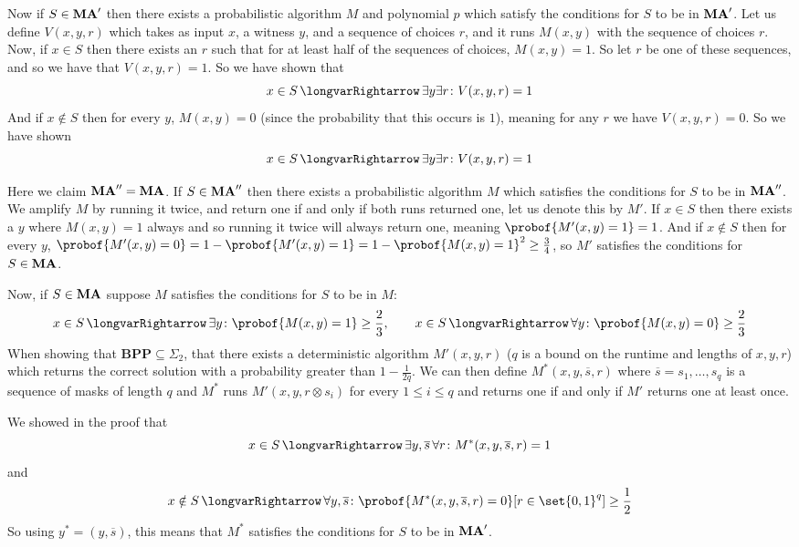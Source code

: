 \documentclass[10pt]{article}
\def\implies{\,\longvarRightarrow\,}
\def\BPP{\mathbf{BPP}}
\begin{document}
    Now if $S\in\mathbf{MA}'$ then there exists a probabilistic algorithm $M$ and polynomial $p$ which satisfy the conditions for $S$ to be in $\mathbf{MA}'$.
    Let us define $V(x,y,r)$ which takes as input $x$, a witness $y$, and a sequence of choices $r$, and it runs $M(x,y)$ with the sequence of choices $r$.
    Now, if $x\in S$ then there exists an $r$ such that for at least half of the sequences of choices, $M(x,y)=1$.
    So let $r$ be one of these sequences, and so we have that $V(x,y,r)=1$.
    So we have shown that
    \[ x\in S \implies \exists y\exists r\colon V(x,y,r)=1 \]
    And if $x\notin S$ then for every $y$, $M(x,y)=0$ (since the probability that this occurs is $1$), meaning for any $r$ we have $V(x,y,r)=0$.
    So we have shown
    \[ x\in S \implies \exists y\exists r\colon V(x,y,r)=1 \]

    \item Here we claim $\mathbf{MA}''=\mathbf{MA}$.
    If $S\in\mathbf{MA}''$ then there exists a probabilistic algorithm $M$ which satisfies the conditions for $S$ to be in $\mathbf{MA}''$.
    We amplify $M$ by running it twice, and return one if and only if both runs returned one, let us denote this by $M'$.
    If $x\in S$ then there exists a $y$ where $M(x,y)=1$ always and so running it twice will always return one, meaning $\probof{M'(x,y)=1}=1$.
    And if $x\notin S$ then for every $y$, $\probof{M'(x,y)=0}=1-\probof{M'(x,y)=1}=1-\probof{M(x,y)=1}^2\geq\frac34$, so $M'$ satisfies the conditions for $S\in\mathbf{MA}$.

    Now, if $S\in\mathbf{MA}$ suppose $M$ satisfies the conditions for $S$ to be in $M$:
    \[ x\in S\implies \exists y\colon \probof{M(x,y)=1}\geq\frac23,\qquad x\in S\implies\forall y\colon \probof{M(x,y)=0}\geq\frac23 \]
    When showing that $\BPP\subseteq\Sigma_2$, that there exists a deterministic algorithm $M'(x,y,r)$ ($q$ is a bound on the runtime and lengths of $x,y,r$) which returns the correct solution with a
    probability greater than $1-\frac1{2q}$.
    We can then define $M^*(x,y,\overline s,r)$ where $\overline s=s_1,\dots,s_q$ is a sequence of masks of length $q$ and $M^*$ runs $M'(x,y,r\otimes s_i)$ for every $1\leq i\leq q$ and returns one if
    and only if $M'$ returns one at least once.

    We showed in the proof that
    \[ x\in S \implies \exists y,\overline s\,\forall r\colon M^*(x,y,\overline s,r) = 1 \]
    and
    \[ x\notin S \implies \forall y,\overline s\colon \probof{M^*(x,y,\overline s,r)=0}[r\in\set{0,1}^q] \geq \frac12 \]
    So using $y^*=(y,\overline s)$, this means that $M^*$ satisfies the conditions for $S$ to be in $\mathbf{MA}'$.
\end{document}
